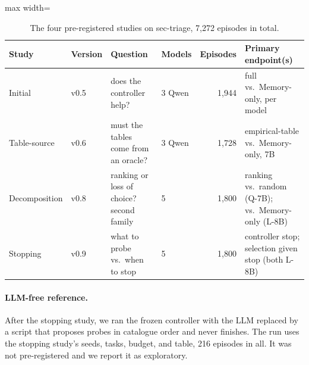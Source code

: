 \begin{table}[t]
  \centering\small
  \begin{adjustbox}{max width=\textwidth}
  \begin{tabular}{llllrl}
    \toprule
    Study & Version & Question & Models & Episodes & Primary endpoint(s) \\
    \midrule
    Initial & v0.5 & does the controller help? & 3 Qwen & 1{,}944 & full \hesp{} vs.\ Memory-only, per model \\
    Table-source & v0.6 & must the tables come from an oracle? & 3 Qwen & 1{,}728 & empirical-table \hesp{} vs.\ Memory-only, 7B \\
    Decomposition & v0.8 & ranking or loss of choice? second family & 5 & 1{,}800 & ranking vs.\ random (Q-7B); \hesp{} vs.\ Memory-only (L-8B) \\
    Stopping & v0.9 & what to probe vs.\ when to stop & 5 & 1{,}800 & controller stop; selection given stop (both L-8B) \\
    \bottomrule
  \end{tabular}
  \end{adjustbox}
  \caption{The four pre-registered studies on sec-triage, 7{,}272 episodes in total.}
  \label{tab:studies}
\end{table}

\paragraph{LLM-free reference.} After the stopping study, we ran the frozen controller with the LLM replaced by a script that proposes probes in catalogue order and never finishes. The run uses the stopping study's seeds, tasks, budget, and table, 216 episodes in all. It was not pre-registered and we report it as exploratory.

